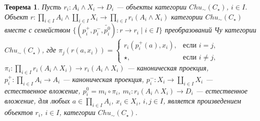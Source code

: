 \documentclass[a4paper,12pt]{article}
\newtheorem{theorem}{Теорема}
\begin{document}
\begin{theorem}\label{product-c}
    Пусть $r_i: A_i \wedge X_i \to D_i$ --- объекты категории $Chu_\sim(C_\star)$, $i \in I$. Объект $r: \prod_{i \in I} A_i \wedge \coprod_{i \in I} X_i \to \prod_{i \in I} r_i(A_i \wedge X_i)$ категории $Chu_\sim(C_\star)$ вместе с семейством $\{(p^+_i,p^-_i,\widetilde{p^0_i}): r \to r_i \mid i \in I\}$ преобразований Чу категории $Chu_\sim(C_\star)$, где $\pi_j(r(a,x_i)) = 
    \begin{cases}
        r_i(p^+_i(a),x_i),& \text{если } i = j,\\
        \star,& \text{если } i \ne j,
    \end{cases}$
    $\pi_i: \prod_{i \in I} r_i(A_i \wedge X_i) \to r_i(A_i \wedge X_i)$ --- каноническая проекция, $p^+_i: \prod_{i \in I} A_i \to A_i$ --- каноническая проекция, $p^-_i: X_i \to \coprod_{i \in I} X_i$ --- естественное вложение, $p^0_i = m_i \circ \pi_i$, $m_i: r_i(A_i \wedge X_i) \to D_i$ --- естественное вложение, для любых $a \in \prod_{i \in I} A_i$, $x_i \in X_i$, $i,j \in I$, является произведением объектов $r_i$, $i \in I$, категории $Chu_\sim(C_\star)$.
\end{theorem}
\end{document}
